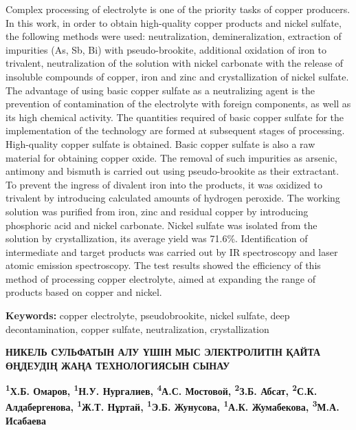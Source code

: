 Complex processing of electrolyte is one of the priority tasks of copper
producers. In this work, in order to obtain high-quality copper products
and nickel sulfate, the following methods were used: neutralization,
demineralization, extraction of impurities (As, Sb, Bi) with
pseudo-brookite, additional oxidation of iron to trivalent,
neutralization of the solution with nickel carbonate with the release of
insoluble compounds of copper, iron and zinc and crystallization of
nickel sulfate. The advantage of using basic copper sulfate as a
neutralizing agent is the prevention of contamination of the electrolyte
with foreign components, as well as its high chemical activity. The
quantities required of basic copper sulfate for the implementation of
the technology are formed at subsequent stages of processing.
High-quality copper sulfate is obtained. Basic copper sulfate is also a
raw material for obtaining copper oxide. The removal of such impurities
as arsenic, antimony and bismuth is carried out using pseudo-brookite as
their extractant. To prevent the ingress of divalent iron into the
products, it was oxidized to trivalent by introducing calculated amounts
of hydrogen peroxide. The working solution was purified from iron, zinc
and residual copper by introducing phosphoric acid and nickel carbonate.
Nickel sulfate was isolated from the solution by crystallization, its
average yield was 71.6\%. Identification of intermediate and target
products was carried out by IR spectroscopy and laser atomic emission
spectroscopy. The test results showed the efficiency of this method of
processing copper electrolyte, aimed at expanding the range of products
based on copper and nickel.

{\bfseries Keywords:} copper electrolyte, pseudobrookite, nickel sulfate,
deep decontamination, copper sulfate, neutralization, crystallization

\begin{articleheader}
{\bfseries НИКЕЛЬ СУЛЬФАТЫН АЛУ ҮШІН МЫС ЭЛЕКТРОЛИТІН ҚАЙТА ӨҢДЕУДІҢ ЖАҢА ТЕХНОЛОГИЯСЫН СЫНАУ}

{\bfseries
\textsuperscript{1}Х.Б. Омаров\textsuperscript{\envelope },
\textsuperscript{1}Н.У. Нургалиев\textsuperscript{\envelope },
\textsuperscript{4}А.С. Мостовой,
\textsuperscript{2}З.Б. Абсат,
\textsuperscript{2}С.К. Алдабергенова,
\textsuperscript{1}Ж.Т. Нұртай,
\textsuperscript{1}Э.Б. Жунусова,
\textsuperscript{1}А.К. Жумабекова,
\textsuperscript{3}М.А. Исабаева}
\end{articleheader}

